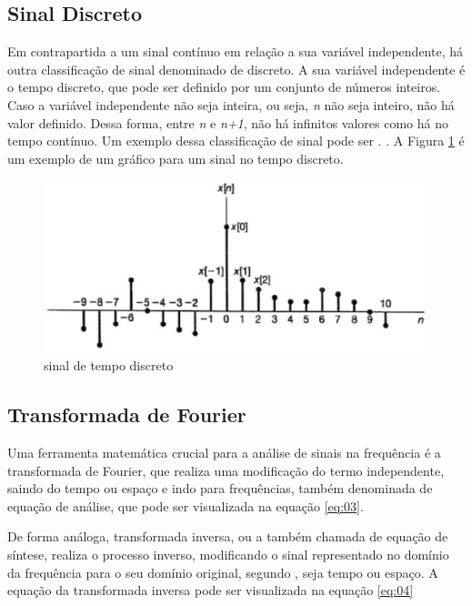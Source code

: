 \subsection{Sinal Discreto}
Em contrapartida a um sinal contínuo em relação a sua variável independente, há outra classificação de sinal denominado de discreto. A sua variável independente é o tempo discreto, que pode ser definido por um conjunto de números inteiros. Caso a variável independente não seja inteira, ou seja, \textit{n} não seja inteiro, não há  valor definido. Dessa forma, entre \textit{n} e \textit{n+1}, não há infinitos valores como há no tempo contínuo. Um exemplo dessa classificação de sinal pode ser . \cite{oppenheim2010sinais}. A Figura \ref{fig02} é um exemplo de um gráfico para um sinal no tempo discreto. 


\begin{figure}[h]
	\centering
    \includegraphics[scale=0.5]{figuras/fig02.eps}
	\caption{sinal de tempo discreto}
	\label{fig02}
\end{figure}

\subsection{Transformada de Fourier}
Uma ferramenta matemática crucial para a análise de sinais na frequência é a transformada de Fourier, que realiza uma modificação do termo independente, saindo do tempo ou espaço e indo para frequências, também denominada de equação de análise, que pode ser visualizada na equação \ref{eq:03}. \par De forma análoga, transformada inversa, ou a também chamada de equação de síntese, realiza o processo inverso, modificando o sinal representado no domínio da frequência para o seu domínio original, segundo \cite{oppenheim2010sinais}, seja tempo ou espaço. A equação da transformada inversa pode ser visualizada na equação \ref{eq:04}

